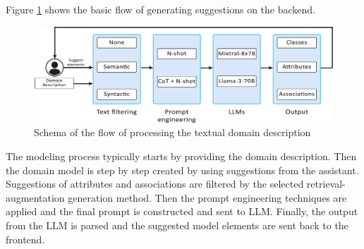 Figure \ref{fig:work-flow} shows the basic flow of generating suggestions on the backend.

\begin{figure}[!h]
    \centering
    \includegraphics[scale=0.23]{img/work-flow.jpg}
    \caption{\centering Schema of the flow of processing the textual domain description}
    \label{fig:work-flow}
\end{figure}

The modeling process typically starts by providing the domain description. Then the domain model is step by step created by using suggestions from the assistant. Suggestions of attributes and associations are filtered by the selected retrieval-augmentation generation method. Then the prompt engineering techniques are applied and the final prompt is constructed and sent to LLM. Finally, the output from the LLM is parsed and the suggested model elements are sent back to the frontend.